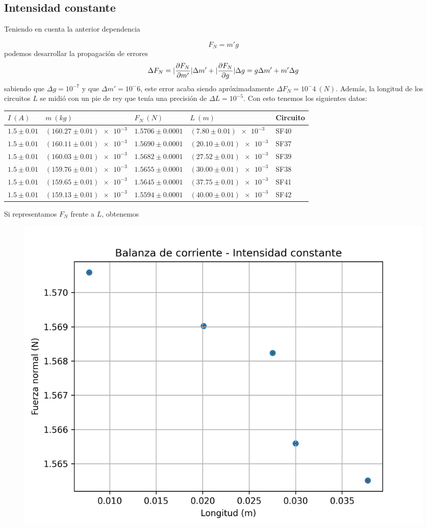 \documentclass{article}
\begin{document}
\subsection{Intensidad constante}
Teniendo en cuenta la anterior dependencia

\[
    F_N = m'g
\]
podemos desarrollar la propagación de errores
\[
    \Delta F_N = |\pdv{F_N}{m'}|\Delta m' +|\pdv{F_N}{g}|\Delta g = g\Delta m' + m'\Delta g
\]
sabiendo que \(\Delta g =10^{-7}\) y que \(\Delta m' = 10^-6\), este error acaba siendo apróximadamente \(\Delta F_N = 10^-4~(N)\).
Además, la longitud de los circuitos $L$ se midió con un pie de rey que tenía una precisión de $\Delta L =10^{-5}$.
Con esto tenemos los siguientes datos:
\begin{table}[H]
    \begin{tabular}{l|l|l|l|l}
    $I~(A)$ & $m~(kg)$                       & $F_N~(N)$         & $L~(m)$             & Circuito \\
    \hline
    $1.5\pm0.01$     & $(160.27\pm 0.01)\num{e-3}$ & $1.5706\pm0.0001$ & $(7.80\pm 0.01)\num{e-3}$ & SF40\\
    \hline
    $1.5\pm0.01$ & $(160.11\pm 0.01)\num{e-3}$ & $1.5690\pm 0.0001$ & $(20.10\pm 0.01)\num{e-3}$ & SF37\\
    \hline
    $1.5\pm0.01$ & $(160.03\pm 0.01)\num{e-3}$ & $1.5682\pm 0.0001$ & $(27.52\pm0.01)\num{e-3}$ & SF39\\
    \hline
    $1.5\pm0.01$ & $(159.76\pm 0.01)\num{e-3}$ &  $1.5655\pm 0.0001$ & $(30.00\pm0.01)\num{e-3}$ & SF38\\
    \hline
    $1.5\pm0.01$ & $(159.65\pm0.01)\num{e-3}$ & $1.5645\pm0.0001$ & $(37.75\pm0.01)\num{e-3}$ & SF41\\
    \hline
    $1.5\pm0.01$ & $(159.13\pm0.01)\num{e-3}$ & $1.5594\pm0.0001$ & $(40.00\pm0.01)\num{e-3}$ & SF42
    \end{tabular}
    \end{table}
Si representamos $F_N$ frente a $L$, obtenemos
\begin{figure}[H]
    \centering
    \includegraphics[scale=0.75]{images/f_n_contra_l.png}
\end{figure}
\end{document}
